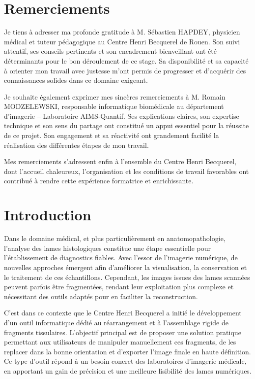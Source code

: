\documentclass[12pt,a4paper]{report}
\begin{document}
\chapter*{Remerciements}

Je tiens à adresser ma profonde gratitude à M. Sébastien HAPDEY, physicien médical et tuteur pédagogique au Centre Henri Becquerel de Rouen. Son suivi attentif, ses conseils pertinents et son encadrement bienveillant ont été déterminants pour le bon déroulement de ce stage. Sa disponibilité et sa capacité à orienter mon travail avec justesse m'ont permis de progresser et d'acquérir des connaissances solides dans ce domaine exigeant.

Je souhaite également exprimer mes sincères remerciements à M. Romain MODZELEWSKI, responsable informatique biomédicale au département d'imagerie – Laboratoire AIMS-Quantif. Ses explications claires, son expertise technique et son sens du partage ont constitué un appui essentiel pour la réussite de ce projet. Son engagement et sa réactivité ont grandement facilité la réalisation des différentes étapes de mon travail.

Mes remerciements s'adressent enfin à l'ensemble du Centre Henri Becquerel, dont l'accueil chaleureux, l'organisation et les conditions de travail favorables ont contribué à rendre cette expérience formatrice et enrichissante.

\tableofcontents
\newpage

\listoffigures
\newpage

\listoftables
\newpage

\chapter*{Introduction}

Dans le domaine médical, et plus particulièrement en anatomopathologie, l'analyse des lames histologiques constitue une étape essentielle pour l'établissement de diagnostics fiables. Avec l'essor de l'imagerie numérique, de nouvelles approches émergent afin d'améliorer la visualisation, la conservation et le traitement de ces échantillons. Cependant, les images issues des lames scannées peuvent parfois être fragmentées, rendant leur exploitation plus complexe et nécessitant des outils adaptés pour en faciliter la reconstruction.

C'est dans ce contexte que le Centre Henri Becquerel a initié le développement d'un outil informatique dédié au réarrangement et à l'assemblage rigide de fragments tissulaires. L'objectif principal est de proposer une solution pratique permettant aux utilisateurs de manipuler manuellement ces fragments, de les replacer dans la bonne orientation et d'exporter l'image finale en haute définition. Ce type d'outil répond à un besoin concret des laboratoires d'imagerie médicale, en apportant un gain de précision et une meilleure lisibilité des lames numériques.
\end{document}
